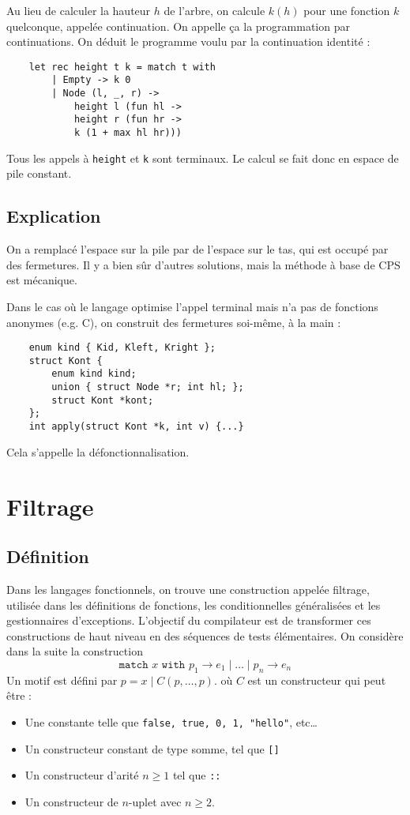 \documentclass{cours}
\begin{document}
Au lieu de calculer la hauteur $h$ de l'arbre, on calcule $k(h)$ pour une fonction $k$ quelconque, appelée continuation. On appelle ça la programmation par continuations. On déduit le programme voulu par la continuation identité :

\begin{verbatim}
    let rec height t k = match t with 
        | Empty -> k 0
        | Node (l, _, r) -> 
            height l (fun hl ->
            height r (fun hr ->
            k (1 + max hl hr)))
\end{verbatim}
Tous les appels à \texttt{height} et \texttt{k} sont terminaux. Le calcul se fait donc en espace de pile constant.

\subsection{Explication}
On a remplacé l'espace sur la pile par de l'espace sur le tas, qui est occupé par des fermetures. Il y a bien sûr d'autres solutions, mais la méthode à base de CPS est mécanique.

Dans le cas où le langage optimise l'appel terminal mais n'a pas de fonctions anonymes (e.g. C), on construit des fermetures soi-même, à la main :
\begin{verbatim}
    enum kind { Kid, Kleft, Kright };
    struct Kont {
        enum kind kind;
        union { struct Node *r; int hl; };
        struct Kont *kont;
    };
    int apply(struct Kont *k, int v) {...}
\end{verbatim}

Cela s'appelle la défonctionnalisation.

\section{Filtrage}
\subsection{Définition}
Dans les langages fonctionnels, on trouve une construction appelée filtrage, utilisée dans les définitions de fonctions, les conditionnelles généralisées et les gestionnaires d'exceptions. L'objectif du compilateur est de transformer ces constructions de haut niveau en des séquences de tests élémentaires. On considère dans la suite la construction
\[
    \texttt{match } x \texttt{ with } p_{1} \rightarrow e_{1} \mid \ldots \mid p_{n} \rightarrow e_{n}
\]
Un motif est défini par $p = x \mid C(p, \ldots, p)$. où $C$ est un constructeur qui peut être :
\begin{itemize}
    \item Une constante telle que \texttt{false, true, 0, 1, "hello"}, etc\dots
    \item Un constructeur constant de type somme, tel que \texttt{[]}
    \item Un constructeur d'arité $n \geq 1$ tel que \texttt{::}
    \item Un constructeur de $n$-uplet avec $n \geq 2$.
\end{itemize}
\end{document}

